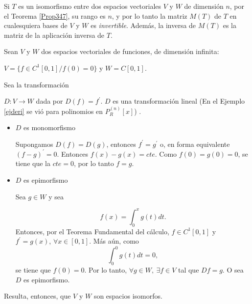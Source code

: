 \bigskip

\begin{remark}
Si $T$ es un isomorfismo entre dos espacios vectoriales $V$ y $W$ de dimensión $n$, por el Teorema \ref{Prop347}, su rango es $n$, y por lo tanto la matriz $M(T)$ de $T$ en cualesquiera bases de $V$ y $W$ es \textit{invertible}. Además, la inversa de $M(T)$ es la matriz de la aplicación inversa de $T$.
\end{remark}


\bigskip

\begin{example}
Sean $V$ y $W$  dos espacios vectoriales de funciones,   de dimensión infinita:

 \bigskip
 
 $V=\{ f \in C^1[0,1] / f(0)=0 \}$ y $W=C[0,1] $.

 \bigskip
 
Sea la transformación 

\bigskip
 
 $D: V  \rightarrow W$ dada por $D(f)= f^{\prime}$. $D$ es una transformación lineal (En el Ejemplo \ref{ejderi} se vió para polinomios en $P_R^{(n)}[x]$) .
 \begin{itemize}
\item
$D$ es monomorfismo

Supongamos $D(f)=D(g)$, entonces $f^{\prime}= g^{\prime}$ o, en forma equivalente $(f-g)^{\prime}=0$. Entonces $f(x)-g(x)=cte$. Como $f(0)=g(0)=0$, se tiene que la $cte=0$, por lo tanto $f=g$. 
\item
$D$ es epimorfismo

Sea $g \in W$ y sea 

\[
f(x)=\int_0^x g(t)dt.
\]
Entonces, por el Teorema Fundamental del cálculo, $f \in C^1[0,1]$  y $f^{\prime}=g(x)$,  $ \forall  x \in [0,1]$.
Más aún, como \[
\int_0^0 g(t)dt=0, 
\]
\noindent
se tiene que 
$f(0)=0$. Por lo tanto, $\forall g \in W,  ~ \exists f \in V $  tal que $Df=g$. O sea $D$ es epimorfismo.
\end{itemize}
Resulta, entonces, que $V$ y $W$ son espacios isomorfos.
\end{example}

\bigskip

